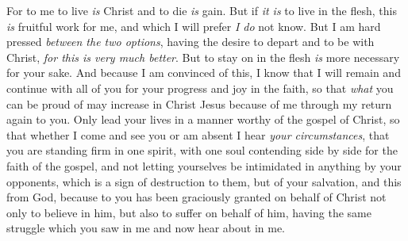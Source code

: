 \begin{biblechapter}
\verse For to me to live \textit{is} Christ and to die \textit{is} gain.
\verse But if \textit{it is} to live in the flesh, this \textit{is} fruitful work for me, and which I will prefer \textit{I do} not know.
\verse But I am hard pressed \textit{between the two options}, having the desire to depart and to be with Christ, \textit{for this is very much better}.
\verse But to stay on in the flesh \textit{is} more necessary for your sake.
\verse And because I am convinced of this, I know that I will remain and continue with all of you for your progress and joy in the faith,
\verse so that \textit{what} you can be proud of may increase in Christ Jesus because of me through my return again to you.
 Only lead your lives in a manner worthy of the gospel of Christ, so that whether I come and see you or am absent I hear \textit{your circumstances}, that you are standing firm in one spirit, with one soul contending side by side for the faith of the gospel,
\verse and not letting yourselves be intimidated in anything by your opponents, which is a sign of destruction to them, but of your salvation, and this from God,
\verse because to you has been graciously granted on behalf of Christ not only to believe in him, but also to suffer on behalf of him,
\verse having the same struggle which you saw in me and now hear about in me.
\end{biblechapter}

